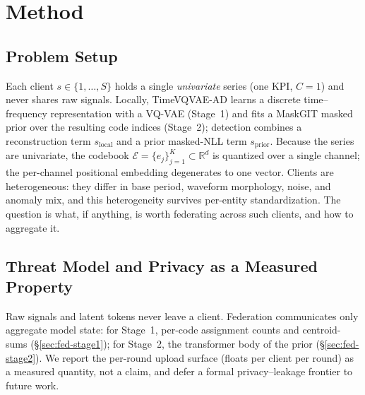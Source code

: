 
\section{Method}
\label{sec:fed-method}

\subsection{Problem Setup}
\label{sec:fed-setup}
Each client $s\in\{1,\dots,S\}$ holds a single \emph{univariate} series (one KPI,
$C{=}1$) and never shares raw signals. Locally, TimeVQVAE-AD learns a discrete
time--frequency representation with a VQ-VAE (Stage~1) and fits a MaskGIT masked prior
over the resulting code indices (Stage~2); detection combines a reconstruction term
$s_{\mathrm{local}}$ and a prior masked-NLL term $s_{\mathrm{prior}}$. Because the series
are univariate, the codebook $\mathcal{E}=\{e_j\}_{j=1}^{K}\subset\mathbb{R}^{d}$ is
quantized over a single channel; the per-channel positional embedding degenerates to one
vector. Clients are heterogeneous: they differ in base period, waveform morphology, noise,
and anomaly mix, and this heterogeneity survives per-entity standardization. The question
is what, if anything, is worth federating across such clients, and how to aggregate it.

\subsection{Threat Model and Privacy as a Measured Property}
\label{sec:fed-threat}
Raw signals and latent tokens never leave a client. Federation communicates only
aggregate model state: for Stage~1, per-code assignment counts and centroid-sums
(\S\ref{sec:fed-stage1}); for Stage~2, the transformer body of the prior
(\S\ref{sec:fed-stage2}). We report the per-round upload surface (floats per client per
round) as a measured quantity, not a claim, and defer a formal privacy--leakage frontier
to future work.

